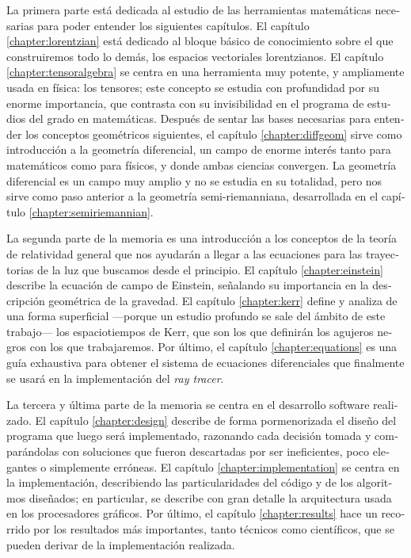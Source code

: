 \begin{otherlanguage}{spanish}
La primera parte está dedicada al estudio de las herramientas matemáticas necesarias para poder entender los siguientes capítulos. El capítulo \ref{chapter:lorentzian} está dedicado al bloque básico de conocimiento sobre el que construiremos todo lo demás, los espacios vectoriales lorentzianos. El capítulo \ref{chapter:tensoralgebra} se centra en una herramienta muy potente, y ampliamente usada en física: los tensores; este concepto se estudia con profundidad por su enorme importancia, que contrasta con su invisibilidad en el programa de estudios del grado en matemáticas. Después de sentar las bases necesarias para entender los conceptos geométricos siguientes, el capítulo \ref{chapter:diffgeom} sirve como introducción a la geometría diferencial, un campo de enorme interés tanto para matemáticos como para físicos, y donde ambas ciencias convergen. La geometría diferencial es un campo muy amplio y no se estudia en su totalidad, pero nos sirve como paso anterior a la geometría semi-riemanniana, desarrollada en el capítulo \ref{chapter:semiriemannian}.

La segunda parte de la memoria es una introducción a los conceptos de la teoría de relatividad general que nos ayudarán a llegar a las ecuaciones para las trayectorias de la luz que buscamos desde el principio. El capítulo \ref{chapter:einstein} describe la ecuación de campo de Einstein, señalando su importancia en la descripción geométrica de la gravedad. El capítulo \ref{chapter:kerr} define y analiza de una forma superficial ---porque un estudio profundo se sale del ámbito de este trabajo--- los espaciotiempos de Kerr, que son los que definirán los agujeros negros con los que trabajaremos. Por último, el capítulo \ref{chapter:equations} es una guía exhaustiva para obtener el sistema de ecuaciones diferenciales que finalmente se usará en la implementación del \emph{ray tracer}.

La tercera y última parte de la memoria se centra en el desarrollo software realizado. El capítulo \ref{chapter:design} describe de forma pormenorizada el diseño del programa que luego será implementado, razonando cada decisión tomada y comparándolas con soluciones que fueron descartadas por ser ineficientes, poco elegantes o simplemente erróneas. El capítulo \ref{chapter:implementation} se centra en la implementación, describiendo las particularidades del código y de los algoritmos diseñados; en particular, se describe con gran detalle la arquitectura usada en los procesadores gráficos. Por último, el capítulo \ref{chapter:results} hace un recorrido por los resultados más importantes, tanto técnicos como científicos, que se pueden derivar de la implementación realizada.


\end{otherlanguage}
